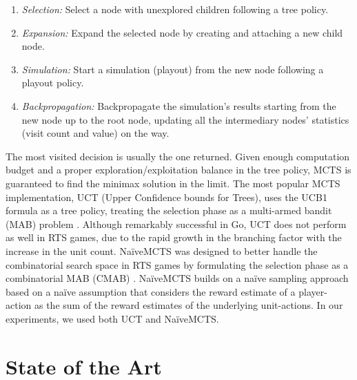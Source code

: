 \documentclass[conference]{IEEEtran}
\begin{document}
\begin{enumerate}
\item \textit{Selection:} Select a node with unexplored children following a tree policy.
\item \textit{Expansion:} Expand the selected node by creating and attaching a new child node.
\item \textit{Simulation:} Start a simulation (playout) from the new node following a playout policy.
\item \textit{Backpropagation:} Backpropagate the simulation's results starting from the new node up to the root node, updating all the intermediary nodes' statistics (visit count and value) on the way.
\end{enumerate}

The most visited decision is usually the one returned. Given enough computation budget and a proper exploration/exploitation balance in the tree policy, MCTS is guaranteed to find the minimax solution in the limit. The most popular MCTS implementation, UCT (Upper Confidence bounds for Trees), uses the UCB1 formula as a tree policy, treating the selection phase as a multi-armed bandit (MAB) problem \cite{browne_survey_2012}. Although remarkably successful in Go, UCT does not perform as well in RTS games, due to the rapid growth in the branching factor with the increase in the unit count. NaïveMCTS was designed to better handle the combinatorial search space in RTS games by formulating the selection phase as a combinatorial MAB (CMAB) \cite{ontanon_combinatorial_2017}. NaïveMCTS builds on a naïve sampling approach based on a naïve assumption that considers the reward estimate of a player-action as the sum of the reward estimates of the underlying unit-actions. In our experiments, we used both UCT and NaïveMCTS.



\section{State of the Art}
\label{sec:state_of_the_art}

\end{document}
